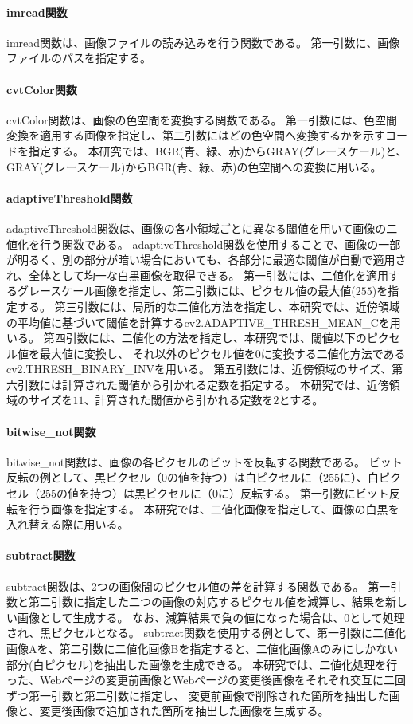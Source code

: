 \paragraph{imread関数}
imread関数は、画像ファイルの読み込みを行う関数である。
第一引数に、画像ファイルのパスを指定する。
\paragraph{cvtColor関数}
cvtColor関数は、画像の色空間を変換する関数である。
第一引数には、色空間変換を適用する画像を指定し、第二引数にはどの色空間へ変換するかを示すコードを指定する。
本研究では、BGR(青、緑、赤)からGRAY(グレースケール)と、GRAY(グレースケール)からBGR(青、緑、赤)の色空間への変換に用いる。
\paragraph{adaptiveThreshold関数}
adaptiveThreshold関数は、画像の各小領域ごとに異なる閾値を用いて画像の二値化を行う関数である。
adaptiveThreshold関数を使用することで、画像の一部が明るく、別の部分が暗い場合においても、各部分に最適な閾値が自動で適用され、全体として均一な白黒画像を取得できる。
第一引数には、二値化を適用するグレースケール画像を指定し、第二引数には、ピクセル値の最大値($255$)を指定する。
第三引数には、局所的な二値化方法を指定し、本研究では、近傍領域の平均値に基づいて閾値を計算するcv2.ADAPTIVE\_THRESH\_MEAN\_Cを用いる。
第四引数には、二値化の方法を指定し、本研究では、閾値以下のピクセル値を最大値に変換し、
それ以外のピクセル値を$0$に変換する二値化方法であるcv2.THRESH\_BINARY\_INVを用いる。
第五引数には、近傍領域のサイズ、第六引数には計算された閾値から引かれる定数を指定する。
本研究では、近傍領域のサイズを$11$、計算された閾値から引かれる定数を$2$とする。
\paragraph{bitwise\_not関数}
bitwise\_not関数は、画像の各ピクセルのビットを反転する関数である。
ビット反転の例として、黒ピクセル（$0$の値を持つ）は白ピクセルに（$255$に）、白ピクセル（$255$の値を持つ）は黒ピクセルに（$0$に）反転する。
第一引数にビット反転を行う画像を指定する。
本研究では、二値化画像を指定して、画像の白黒を入れ替える際に用いる。
\paragraph{subtract関数}
subtract関数は、2つの画像間のピクセル値の差を計算する関数である。
第一引数と第二引数に指定した二つの画像の対応するピクセル値を減算し、結果を新しい画像として生成する。
なお、減算結果で負の値になった場合は、$0$として処理され、黒ピクセルとなる。
subtract関数を使用する例として、第一引数に二値化画像Aを、第二引数に二値化画像Bを指定すると、二値化画像Aのみにしかない部分(白ピクセル)を抽出した画像を生成できる。
本研究では、二値化処理を行った、Webページの変更前画像とWebページの変更後画像をそれぞれ交互に二回ずつ第一引数と第二引数に指定し、
変更前画像で削除された箇所を抽出した画像と、変更後画像で追加された箇所を抽出した画像を生成する。
